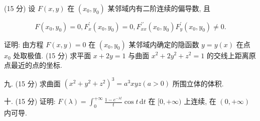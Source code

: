 \documentclass{examcollection}
\renewcommand{\displayformula}[1]{\[#1\]}
\begin{document}
{\begin{minipage}{\textwidth}
(15 分) 设 $F(x, y)$ 在 $(x_{0}, y_{0})$ 某邻域内有二阶连续的偏导数, 且\par
\displayformula{F (x _ {0}, y _ {0}) = 0, F _ {x} ^ {\prime} (x _ {0}, y _ {0}) = 0, F _ {x x} ^ {\prime \prime} (x _ {0}, y _ {0}) F _ {y} ^ {\prime} (x _ {0}, y _ {0}) \neq 0.}\par
证明: 由方程 $F(x, y) = 0$ 在 $(x_0, y_0)$ 某邻域内确定的隐函数 $y = y(x)$ 在点 $x_0$ 处取极值.
(15 分) 求平面 $x + 2y = 1$ 与曲面 $x^2 + 2y^2 + z^2 = 1$ 的交线上距离原点最近的点的坐标.\par
九. (15 分) 求曲面 $(x^{2} + y^{2} + z^{2})^{3} = a^{3}xyz (a > 0)$ 所围立体的体积.\par
十. (15 分) 证明: $F(\lambda) = \int_{0}^{+\infty} \frac{1 - e^{-\lambda t}}{t} \cos t \, \mathrm{d}t$ 在 $[0, +\infty)$ 上连续, 在 $(0, +\infty)$ 内可导.\par
\end{minipage}}
\ifdim\dimexpr\ht\proofbox+\dp\proofbox\relax>\textheight
\noindent\resizebox{!}{\textheight}{\usebox{\proofbox}}\else\noindent\usebox{\proofbox}\fi\clearpage
\end{document}
